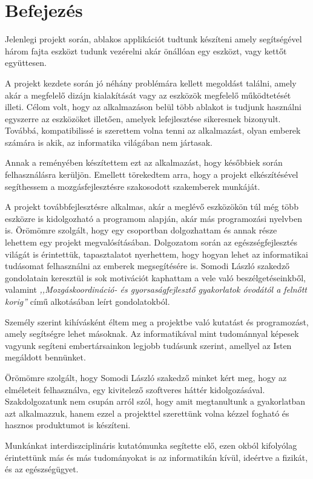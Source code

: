 \documentclass[tocnopagenum]{thesis-ekf}
\theoremstyle{definition}
\theoremstyle{remark}
\begin{document}
	\chapter*{Befejezés}
	Jelenlegi projekt során, ablakos applikációt tudtunk készíteni amely segítségével három fajta eszközt tudunk vezérelni akár önállóan egy eszközt, vagy kettőt együttesen.  %
	\par
	A projekt kezdete során jó néhány problémára kellett megoldást találni, amely akár a megfelelő dizájn kialakítását vagy az eszközök megfelelő működtetését illeti. Célom volt, hogy az alkalmazáson belül több ablakot is tudjunk használni egyszerre az eszközöket illetően, amelyek lefejlesztése sikeresnek bizonyult. Továbbá, kompatibilissé is szerettem volna tenni az alkalmazást, olyan emberek számára is akik, az informatika világában nem jártasak. 
	\par
	Annak a reményében készítettem ezt az alkalmazást, hogy későbbiek során felhasználásra kerüljön. Emellett törekedtem arra, hogy a projekt elkészítésével segíthessem a mozgásfejlesztésre szakosodott szakemberek munkáját.
	\par
	A projekt továbbfejlesztésre alkalmas, akár a meglévő eszközökön túl még több eszközre is kidolgozható a programom alapján, akár más programozási nyelvben is.
	Örömömre szolgált, hogy egy csoportban dolgozhattam és annak része lehettem egy projekt megvalósításában. Dolgozatom során az egészségfejlesztés világát is érintettük, tapasztalatot nyerhettem, hogy hogyan lehet az informatikai tudásomat felhasználni az emberek megsegítésére is. Somodi László szakedző gondolatain keresztül is sok motivációt kaphattam a vele való beszélgetéseinkből, valamint \textit{,,Mozgáskoordináció- és gyorsaságfejlesztő gyakorlatok óvodától a felnőtt korig''} című alkotásában leírt gondolatokból.
	
	Személy szerint kihívásként éltem meg a projektbe való kutatást és programozást, amely segítségre lehet másoknak. Az informatikával mint tudománnyal képesek vagyunk segíteni embertársainkon legjobb tudásunk szerint, amellyel az Isten megáldott bennünket.
	
	Örömömre szolgált, hogy Somodi László szakedző minket kért meg, hogy az elméleteit felhasználva, egy kivitelező szoftveres háttér kidolgozásával. Szakdolgozatunk nem csupán arról szól, hogy amit megtanultunk a gyakorlatban azt alkalmazzuk, hanem ezzel a projekttel szerettünk volna kézzel fogható és hasznos produktumot is készíteni.
	
	Munkánkat interdiszciplináris kutatómunka segítette elő, ezen okból kifolyólag érintettünk más és más tudományokat is az informatikán kívül, ideértve a fizikát, és az egészségügyet.
	
\end{document}
